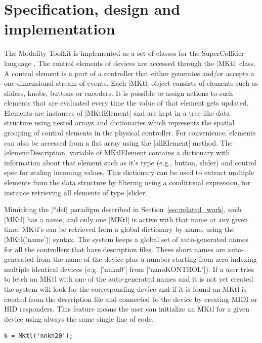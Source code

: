 \documentclass{article}
\begin{document}
\section{Specification, design and implementation}
\label{sec:implementation}


The Modality Toolkit is implemented as a set of classes for the SuperCollider language \cite{mccartney2002-ret}. 
The control elements of devices are accessed through the |MKtl| class. 
A control element is a part of a controller that either generates and/or accepts a one-dimensional stream of events. 
Each |MKtl| object consists of elements such as sliders, knobs, buttons or encoders.
It is possible to assign actions to such elements that are evaluated every time the value of that element gets updated.
Elements are instances of |MKtlElement| and are kept in a tree-like data structure using nested arrays and dictionaries which represents the spatial grouping of control elements in the physical controller. 
For convenience, elements can also be accessed from a flat array using the |allElement| method. 
The |elementDescription| variable of MKtlElement contains a dictionary with information about that element such as it's type (e.g., button, slider) and control spec for scaling incoming values. 
This dictionary can be used to extract multiple elements from the data structure by filtering using a conditional expression, for instance retrieving all elements of type |slider|.

Mimicking the |*def| paradigm described in Section~\ref{sec:related_work}, each |MKtl| has a name, and only one |MKtl| is active with that name at any given time. 
MKtl's can be retrieved from a global dictionary by name, using the |MKtl('name')| syntax. 
The system keeps a global set of auto-generated names for all the controllers that have description files. These short names are auto-generated from the name of the device plus a number starting from zero indexing multiple identical devices (e.g. |'nnkn0'| from |'nanoKONTROL'|). If a user tries to fetch an MKtl with one of the auto-generated names and it is not yet created the system will look for the corresponding device and if it is found an MKtl is created from the description file and connected to the device by creating MIDI or HID responders. This feature means the user can initialize an MKtl for a given device using always the same single line of code.

\begin{Verbatim}
k = MKtl('nnkn20');
\end{Verbatim}
\end{document}
